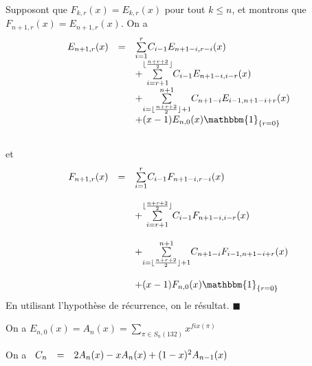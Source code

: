 Supposont que  $F_{k, r}(x)=E_{k, r}(x)$ pour tout $k\leq n$, et montrons que $F_{n+1, r}(x)=E_{n+1, r}(x)$. On a
\[
	\begin{array}{l l l}
		E_{n+1,r}(x) & =       & \underset{i=1}{\overset{r}{\sum}}C_{i-1}E_{n+1-i,r-i}(x)                                        \\
		             & \text{} & +\underset{i=r+1}{\overset{\lfloor \frac{n+r+2}{2}\rfloor}{\sum}}C_{i-1}E_{n+1-i,i-r}(x)        \\
		             & \text{} & +\underset{i=\lfloor \frac{n+r+2}{2}\rfloor +1}{\overset{n+1}{\sum}}C_{n+1-i}E_{i-1,n+1-i+r}(x) \\
		             & \text{} & +(x-1)E_{n,0}(x)\mathbbm{1}_{\{r=0\}}
	\end{array}
\]
\vspace{5pt}\\
et
\vspace{5pt}\\
\[
	\begin{array}{l l l}
		F_{n+1,r}(x) & =       & \underset{i=1}{\overset{r}{\sum}}C_{i-1}F_{n+1-i,r-i}(x)                                       \\ &\text{ }&\\
		             & \text{} & +\underset{i=r+1}{\overset{\lfloor \frac{n+r+2}{2}\rfloor}{\sum}}C_{i-1}F_{n+1-i,i-r}(x)       \\ &\text{ }&\\
		             & \text{} & +\underset{i=\lfloor \frac{n+r+2}{2}\rfloor+1}{\overset{n+1}{\sum}}C_{n+1-i}F_{i-1,n+1-i+r}(x) \\ &\text{ }&\\
		             & \text{} & +(x-1)F_{n,0}(x)\mathbbm{1}_{\{r=0\}}
	\end{array}
\]
En utilisant l'hypothèse de récurrence, on le résultat. $\blacksquare$


\begin{corollaire}
	On a $E_{n, 0}(x) = A_{n}(x) = \underset{\pi \in S_{n}(132)}{\sum} x^{fix(\pi)}$\\
\end{corollaire}

\begin{proposition} \label{newCnExp} On a
	$
		\begin{array}{l l l}
			C_{n}%
			 & = & 2A_{n}(x)-xA_{n}(x)+(1-x)^{2}A_{n-1}(x)
		\end{array}
	$
\end{proposition}

